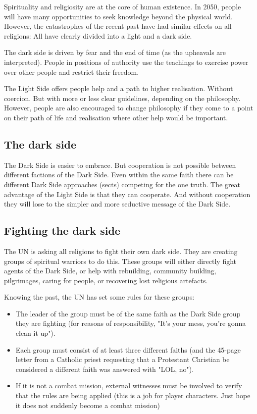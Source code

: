 Spirituality and religiosity are at the core of human existence. In 2050, people will have many opportunities to seek knowledge beyond the physical world.
However, the catastrophes of the recent past have had similar effects on all religions: All have clearly divided into a light and a dark side.

The dark side is driven by fear and the end of time (as the upheavals are interpreted). People in positions of authority use the teachings to exercise power over other people and restrict their freedom.

The Light Side offers people help and a path to higher realisation. Without coercion. But with more or less clear guidelines, depending on the philosophy. However, people are also encouraged to change philosophy if they come to a point on their path of life and realisation where other help would be important.

\subsection{The dark side}

The Dark Side is easier to embrace. But cooperation is not possible between different factions of the Dark Side. Even within the same faith there can be different Dark Side approaches (sects) competing for the one truth.
The great advantage of the Light Side is that they can cooperate. And without cooperation they will lose to the simpler and more seductive message of the Dark Side.

\subsection{Fighting the dark side}

The UN is asking all religions to fight their own dark side. They are creating groups of spiritual warriors to do this. These groups will either directly fight agents of the Dark Side, or help with rebuilding, community building, pilgrimages, caring for people, or recovering lost religious artefacts.

Knowing the past, the UN has set some rules for these groups:

\begin{itemize}
    \item The leader of the group must be of the same faith as the Dark Side group they are fighting (for reasons of responsibility, "It's your mess, you're gonna clean it up").
    \item Each group must consist of at least three different faiths (and the 45-page letter from a Catholic priest requesting that a Protestant Christian be considered a different faith was answered with "LOL, no").
    \item If it is not a combat mission, external witnesses must be involved to verify that the rules are being applied (this is a job for player characters. Just hope it does not suddenly become a combat mission)
\end{itemize}

